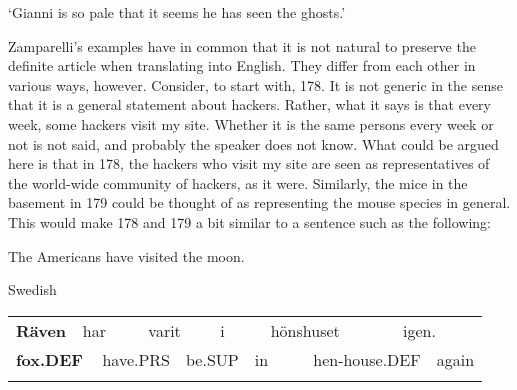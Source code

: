 \begin{styleTranslation}
‘Gianni is so pale that it seems he has seen the ghosts.’

\end{styleTranslation}

\begin{styleBodyTextFirst}
Zamparelli’s examples have in common that it is not natural to preserve the definite article when translating into English. They differ from each other in various ways, however. Consider, to start with, 178. It is not generic in the sense that it is a general statement about hackers. Rather, what it says is that every week, some hackers visit my site. Whether it is the same persons every week or not is not said, and probably the speaker does not know. What could be argued here is that in 178, the hackers who visit my site are seen as representatives of the world-wide community of hackers, as it were. Similarly, the mice in the basement in 179 could be thought of as representing the mouse species in general. This would make 178 and 179 a bit similar to a sentence such as the following: 

\end{styleBodyTextFirst}

\begin{listWWNumileveli}
\item {}

\begin{styleExample}
\label{bkm:Ref69031158}The Americans have visited the moon.

\end{styleExample}

\item {}

\begin{styleExample}
\label{bkm:Ref77501116}Swedish

\end{styleExample}

\end{listWWNumileveli}

\begin{tabular}{llllllllllll}
\lsptoprule
{\bfseries Räven} & \multicolumn{2}{l}{har

} & \multicolumn{2}{l}{varit

} & \multicolumn{2}{l}{i

} & \multicolumn{2}{l}{hönshuset

} & \multicolumn{2}{l}{igen.

} & \\
\multicolumn{2}{l}{{\bfseries fox.DEF}

} & \multicolumn{2}{l}{have.PRS

} & \multicolumn{2}{l}{be.SUP

} & \multicolumn{2}{l}{in

} & \multicolumn{2}{l}{hen-house.DEF

} & \multicolumn{2}{l}{again

}\\
\lspbottomrule
\end{tabular}

